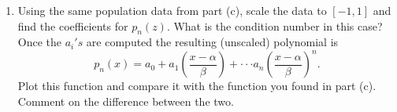 \documentclass[12pt]{article}
\begin{document}
\begin{enumerate}
\begin{enumerate}
	\item Using the same population data from part (c), scale the data to $[-1,1]$ and find the coefficients for $p_n(z)$. What is the condition number in this case? Once the $a_i's$ are computed the resulting (unscaled) polynomial is 
	\[p_n(x)=a_0+a_1\left(\frac{x-\alpha}{\beta}\right)+\cdot\cdot\cdot a_n\left(\frac{x-\alpha}{\beta}\right)^n.\]
Plot this function and compare it with the function you found in part (c). Comment on the difference between the two.
	\end{enumerate}
\end{enumerate}
\end{document}
